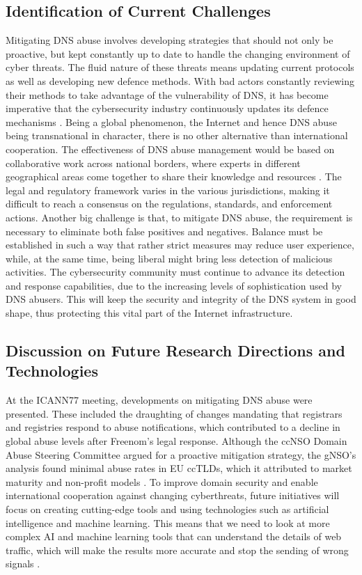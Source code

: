 \subsection{Identification of Current Challenges}

Mitigating DNS abuse involves developing strategies that should not only be proactive, but kept constantly up to date to handle the changing environment of cyber threats. The fluid nature of these threats means updating current protocols as well as developing new defence methods. With bad actors constantly reviewing their methods to take advantage of the vulnerability of DNS, it has become imperative that the cybersecurity industry continuously updates its defence mechanisms \cite{bhattacharya2023dns}. Being a global phenomenon, the Internet and hence DNS abuse being transnational in character, there is no other alternative than international cooperation. The effectiveness of DNS abuse management would be based on collaborative work across national borders, where experts in different geographical areas come together to share their knowledge and resources \cite{altulaihan2022cybersecurity}. The legal and regulatory framework varies in the various jurisdictions, making it difficult to reach a consensus on the regulations, standards, and enforcement actions. Another big challenge is that, to mitigate DNS abuse, the requirement is necessary to eliminate both false positives and negatives. Balance must be established in such a way that rather strict measures may reduce user experience, while, at the same time, being liberal might bring less detection of malicious activities. The cybersecurity community must continue to advance its detection and response capabilities, due to the increasing levels of sophistication used by DNS abusers. This will keep the security and integrity of the DNS system in good shape, thus protecting this vital part of the Internet infrastructure.

\subsection{Discussion on Future Research Directions and Technologies}

At the ICANN77 meeting, developments on mitigating DNS abuse were presented. These included the draughting of changes mandating that registrars and registries respond to abuse notifications, which contributed to a decline in global abuse levels after Freenom's legal response. Although the ccNSO Domain Abuse Steering Committee argued for a proactive mitigation strategy, the gNSO's analysis found minimal abuse rates in EU ccTLDs, which it attributed to market maturity and non-profit models \cite{VanRoste2023}. To improve domain security and enable international cooperation against changing cyberthreats, future initiatives will focus on creating cutting-edge tools and using technologies such as artificial intelligence and machine learning. This means that we need to look at more complex AI and machine learning tools that can understand the details of web traffic, which will make the results more accurate and stop the sending of wrong signals \cite{ISG2023}.


